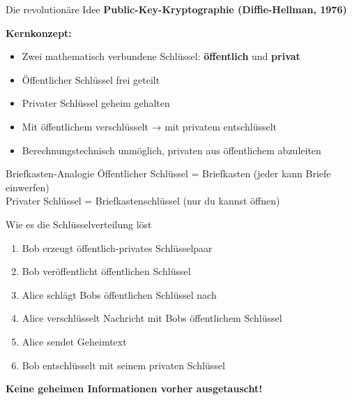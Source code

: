 \documentclass[handout]{beamer}
\begin{document}
\begin{frame}{Die revolutionäre Idee}
\textbf{Public-Key-Kryptographie (Diffie-Hellman, 1976)}

\vspace{0.3cm}
\textbf{Kernkonzept:}
\begin{itemize}
    \item Zwei mathematisch verbundene Schlüssel: \textbf{öffentlich} und \textbf{privat}
    \item Öffentlicher Schlüssel frei geteilt
    \item Privater Schlüssel geheim gehalten
    \item Mit öffentlichem verschlüsselt → mit privatem entschlüsselt
    \item Berechnungstechnisch unmöglich, privaten aus öffentlichem abzuleiten
\end{itemize}

\vspace{0.3cm}
\begin{block}{Briefkasten-Analogie}
Öffentlicher Schlüssel = Briefkasten (jeder kann Briefe einwerfen)\\
Privater Schlüssel = Briefkastenschlüssel (nur du kannst öffnen)
\end{block}

\end{frame}

\begin{frame}{Wie es die Schlüsselverteilung löst}
\begin{enumerate}
    \item Bob erzeugt öffentlich-privates Schlüsselpaar
    \item Bob veröffentlicht öffentlichen Schlüssel
    \item Alice schlägt Bobs öffentlichen Schlüssel nach
    \item Alice verschlüsselt Nachricht mit Bobs öffentlichem Schlüssel
    \item Alice sendet Geheimtext
    \item Bob entschlüsselt mit seinem privaten Schlüssel
\end{enumerate}

\vspace{0.3cm}
\textbf{Keine geheimen Informationen vorher ausgetauscht!}

\end{frame}
\end{document}
